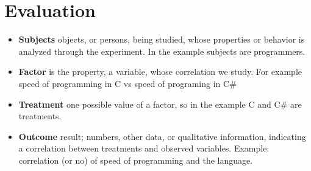 \section{Evaluation}
\begin{itemize}
\item \textbf{Subjects} objects, or persons, being studied, whose properties or behavior is analyzed through the experiment. In the example subjects are programmers. 
\item \textbf{Factor} is the property, a variable, whose correlation we study. For example speed of programming in C vs speed of programing in C\#
\item \textbf{Treatment} one possible value of a factor, so in the example C and C\# are treatments.
\item \textbf{Outcome} result; numbers, other data, or qualitative information, indicating a correlation between treatments and observed variables. Example: correlation (or no) of speed of programming and the language.
\end{itemize}
